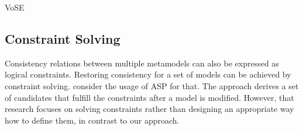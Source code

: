 \begin{copiedFrom}{VoSE}
\subsection*{Constraint Solving}

Consistency relations between multiple metamodels can also be expressed as logical constraints.
Restoring consistency for a set of models can be achieved by constraint solving.
\textcite{eramo2008a} consider the usage of \ac{ASP} for that. %
The approach derives a set of candidates that fulfill the constraints after a model is modified. %
However, that research focuses on solving constraints rather than designing an appropriate way how to define them, in contrast to our \commonalities approach.

\end{copiedFrom} %


